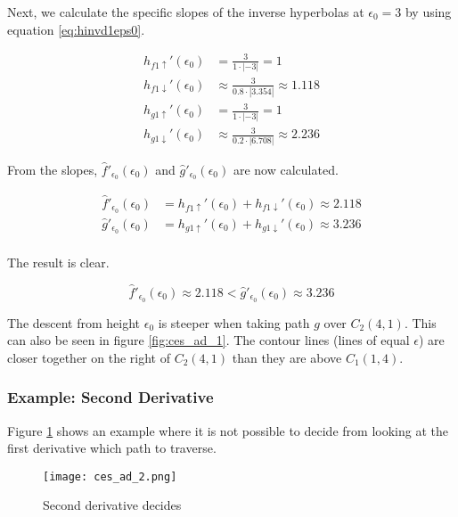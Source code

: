 Next, we calculate the specific slopes of the inverse hyperbolas at $\epsilon_0 = 3$ by using equation \ref{eq:hinvd1eps0}.

\begin{align*}
	h_{f1\uparrow}'(\epsilon_0) &= \frac{3}{1\cdot\left|-3\right|} = 1\\
	h_{f1\downarrow}'(\epsilon_0) &\approx \frac{3}{0.8\cdot\left|3.354\right|} \approx 1.118\\
	h_{g1\uparrow}'(\epsilon_0) &= \frac{3}{1\cdot\left|-3\right|} = 1\\
	h_{g1\downarrow}'(\epsilon_0) &\approx \frac{3}{0.2\cdot\left|6.708\right|} \approx 2.236 
\end{align*}

From the slopes, $\hat{f}'_{\epsilon_0}(\epsilon_0)$ and $\hat{g}'_{\epsilon_0}(\epsilon_0)$ are now calculated.

\begin{align*}
	\hat{f}'_{\epsilon_0}(\epsilon_0) &= h_{f1\uparrow}'(\epsilon_0) + h_{f1\downarrow}'(\epsilon_0) \approx 2.118\\
	\hat{g}'_{\epsilon_0}(\epsilon_0) &= h_{g1\uparrow}'(\epsilon_0) + h_{g1\downarrow}'(\epsilon_0) \approx 3.236\\
\end{align*}

The result is clear.

$$\hat{f}'_{\epsilon_0}(\epsilon_0) \approx 2.118 < \hat{g}'_{\epsilon_0}(\epsilon_0) \approx 3.236$$

The descent from height $\epsilon_0$ is steeper when taking path $g$ over $C_2(4, 1)$. This can also be seen in figure \ref{fig:ces_ad_1}. The contour lines (lines of equal $\epsilon$) are closer together on the right of $C_2(4, 1)$ than they are above $C_1(1, 4)$.


\subsubsection{Example: Second Derivative}

Figure \ref{fig:ces_ad_2} shows an example where it is not possible to decide from looking at the first derivative which path to traverse.

\begin{figure}[H]
	\centering
    
    \texttt{[image: ces\_ad\_2.png]}
		
	\caption{Second derivative decides\protect\footnotemark}
    \label{fig:ces_ad_2}
\end{figure}

